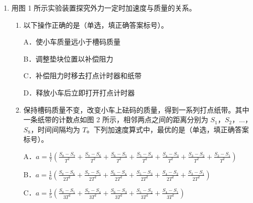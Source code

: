 \documentclass[\gkver]{gaokaozhenti}
\begin{document}
\begin{enumerate}

\item
用图 1 所示实验装置探究外力一定时加速度与质量的关系。
\begin{enumerate}
	\item
	以下操作正确的是（单选，填正确答案标号）。

	A．使小车质量远小于槽码质量

	B．调整垫块位置以补偿阻力

	C．补偿阻力时移去打点计时器和纸带

	D．释放小车后立即打开打点计时器
	\item
	保持槽码质量不变，改变小车上砝码的质量，得到一系列打点纸带。其中一条纸带的计数点如图 2 所示，相邻两点之间的距离分别为 $S_{1}$，$S_{2}$，$\ldots$，$S_{8}$，时间间隔均为 $T$。下列加速度算式中，最优的是（单选，填正确答案标号）。

	A．$a = \frac{1}{7}\left(\frac{S_{8} - S_{7}}{T^{2}} + \frac{S_{7} - S_{6}}{T^{2}} + \frac{S_{6} - S_{5}}{T^{2}} + \frac{S_{5} - S_{4}}{T^{2}} + \frac{S_{4} - S_{3}}{T^{2}} + \frac{S_{3} - S_{2}}{T^{2}} + \frac{S_{2} - S_{1}}{T^{2}}\right)$

	B．$a = \frac{1}{6}\left(\frac{S_{8} - S_{6}}{2T^{2}} + \frac{S_{7} - S_{5}}{2T^{2}} + \frac{S_{6} - S_{4}}{2T^{2}} + \frac{S_{5} - S_{3}}{2T^{2}} + \frac{S_{4} - S_{2}}{2T^{2}} + \frac{S_{3} - S_{1}}{2T^{2}}\right)$

	C．$a = \frac{1}{5}\left(\frac{S_{8} - S_{5}}{3T^{2}} + \frac{S_{7} - S_{4}}{3T^{2}} + \frac{S_{6} - S_{3}}{3T^{2}} + \frac{S_{5} - S_{2}}{3T^{2}} + \frac{S_{4} - S_{1}}{3T^{2}}\right)$


\end{enumerate}
\end{enumerate}
\end{document}
